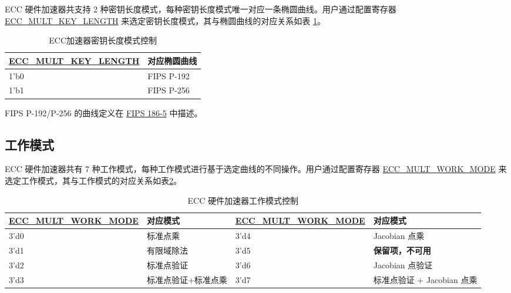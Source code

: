 \documentclass[main\_\_CN.tex]{subfiles}
\begin{document}
\chipname{} ECC 硬件加速器共支持 2 种密钥长度模式，每种密钥长度模式唯一对应一条椭圆曲线。用户通过配置寄存器  \hyperref[fielddesc:ECCMULTKEYLENGTH]{ECC\_MULT\_KEY\_LENGTH} 来选定密钥长度模式，其与椭圆曲线的对应关系如表 \ref{tab:ecc-key-length}。
\begin{table}[H]
    \centering
    \caption{ECC加速器密钥长度模式控制}
    \label{tab:ecc-key-length}
    \begin{threeparttable}
    \begin{tabular}{|p{4.2cm}|p{3.6cm}|}
    \hline
        \rowcolor{lightgray}
        \textbf{\hyperref[fielddesc:ECCMULTKEYLENGTH]{ECC\_MULT\_KEY\_LENGTH}} & \textbf{对应椭圆曲线} \\ \hline
        1'b0 & FIPS P-192  \\\hline
        1'b1 & FIPS P-256  \\\hline
    \end{tabular}
    \begin{tablenotes}
        \item[1] FIPS P-192/P-256 的曲线定义在 \href{https://nvlpubs.nist.gov/nistpubs/FIPS/NIST.FIPS.186-5.pdf}{FIPS 186-5} 中描述。

    \end{tablenotes}
    \end{threeparttable}
\end{table}

\subsection{工作模式}

\chipname{} ECC 硬件加速器共有 7 种工作模式，每种工作模式进行基于选定曲线的不同操作。用户通过配置寄存器 \hyperref[fielddesc:ECCMULTWORKMODE]{ECC\_MULT\_WORK\_MODE} 来选定工作模式，其与工作模式的对应关系如表\ref{tab:ecc-work-mode}。

\begin{table}[H]
    \centering
    \caption{ECC 硬件加速器工作模式控制}
    \label{tab:ecc-work-mode}
    \begin{tabular}{|l|l|l|l|}
    \hline
        \rowcolor{lightgray}
        \textbf{\hyperref[fielddesc:ECCMULTWORKMODE]{ECC\_MULT\_WORK\_MODE}} & \textbf{对应模式} & \textbf{\hyperref[fielddesc:ECCMULTWORKMODE]{ECC\_MULT\_WORK\_MODE}} & \textbf{对应模式} \\ \hline
        3'd0 & 标准点乘            & 3'd4 & Jacobian 点乘            \\\hline
        3'd1 & 有限域除法          & 3'd5 & \textbf{保留项，不可用}  \\\hline
        3'd2 & 标准点验证          & 3'd6 & Jacobian 点验证          \\\hline
        3'd3 & 标准点验证+标准点乘 & 3'd7 & 标准点验证 + Jacobian 点乘  \\\hline
    \end{tabular}
\end{table}
\end{document}
